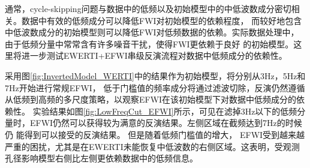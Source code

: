 通常，cycle-skipping问题与数据中的低频以及初始模型中的中低波数成分密切相关。数据中有效的低频成分可以降低FWI对初始模型的依赖程度，
而较好地包含中低波数成分的初始模型则可以降低FWI对低频数据的依赖。实际数据处理中，由于低频分量中常常含有许多噪音干扰，使得FWI更依赖于良好
的初始模型。这里将进一步测试EWERTI+EFWI串级反演流程对数据中低频成分的依赖性。

采用图\ref{fig:InvertedModel_WERTI}中的结果作为初始模型，将分别从3Hz，5Hz和7Hz开始进行常规EFWI，
低于门槛值的频率成分将通过滤波切除，反演仍然遵循从低频到高频的多尺度策略，以观察EFWI在该初始模型下对数据中低频成分的依赖性。
实验结果如图\ref{fig:LowFreqCut_EFWI}所示，可见在滤掉3Hz以下的低频分量时，EFWI仍然可以获得较为满意的反演结果。左侧区域在截频达到7Hz的时候仍
能得到可以接受的反演结果。
但是随着低频门槛值的增大，
EFWI受到越来越严重的困扰，尤其是在EWERTI未能恢复中低波数的右侧区域。这表明，受观测孔径影响模型右侧比左侧更依赖数据中的低频信息。
